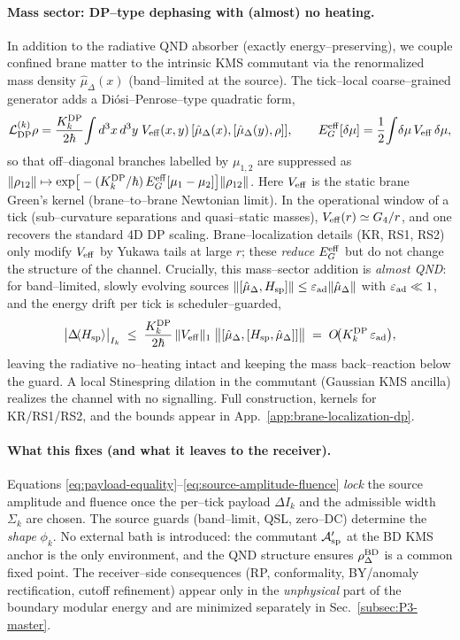 \documentclass[10pt]{article}
\theoremstyle{definition}
\theoremstyle{plain}
\begin{document}
\paragraph{Mass sector: DP–type dephasing with (almost) no heating.}\label{par:uom-main-036}
In addition to the radiative QND absorber (exactly energy–preserving), we couple confined brane matter to the intrinsic KMS commutant via the renormalized mass density $\hat\mu_\Delta(x)$ (band–limited at the source). The tick–local coarse–grained generator adds a Diósi–Penrose–type quadratic form,
\[
\mathcal L_{\rm DP}^{(k)}\rho
=\frac{K_k^{\rm DP}}{2\hbar}\!\int d^3x\,d^3y\;V_{\rm eff}(x,y)\,[\hat\mu_\Delta(x),[\hat\mu_\Delta(y),\rho]],
\qquad
E_G^{\rm eff}[\delta\mu]=\frac12\!\int\! \delta\mu\,V_{\rm eff}\,\delta\mu,
\]
so that off–diagonal branches labelled by $\mu_{1,2}$ are suppressed as
$\|\rho_{12}\|\mapsto \exp\!\big[-(K_k^{\rm DP}/\hbar)\,E_G^{\rm eff}[\mu_1-\mu_2]\big]\|\rho_{12}\|$.
Here $V_{\rm eff}$ is the static brane Green’s kernel (brane–to–brane Newtonian limit). In the operational window of a tick (sub–curvature separations and quasi–static masses), $V_{\rm eff}(r)\simeq G_4/r$, and one recovers the standard 4D DP scaling. Brane–localization details (KR, RS1, RS2) only modify $V_{\rm eff}$ by Yukawa tails at large $r$; these \emph{reduce} $E_G^{\rm eff}$ but do not change the structure of the channel. Crucially, this mass–sector addition is \emph{almost QND}: for band–limited, slowly evolving sources
$\|[\hat\mu_\Delta,H_{\rm sp}]\|\le \varepsilon_{\rm ad}\|\hat\mu_\Delta\|$ with $\varepsilon_{\rm ad}\ll1$, and the energy drift per tick is scheduler–guarded,
\[
\big|\Delta\!\langle H_{\rm sp}\rangle\big|_{I_k}
\;\le\; \frac{K_k^{\rm DP}}{2\hbar}\,
\|V_{\rm eff}\|_{1}\;\big\|[\hat\mu_\Delta,[H_{\rm sp},\hat\mu_\Delta]]\big\|
\;=\;O\!\big(K_k^{\rm DP}\,\varepsilon_{\rm ad}\big),
\]
leaving the radiative no–heating intact and keeping the mass back–reaction below the guard. A local Stinespring dilation in the commutant (Gaussian KMS ancilla) realizes the channel with no signalling. Full construction, kernels for KR/RS1/RS2, and the bounds appear in App.~\ref{app:brane-localization-dp}.




\paragraph{What this fixes (and what it leaves to the receiver).}\label{par:uom-main-037}
Equations \eqref{eq:payload-equality}–\eqref{eq:source-amplitude-fluence} \emph{lock} the
source amplitude and fluence once the per–tick payload $\Delta I_k$ and the admissible
width $\Sigma_k$ are chosen. The source guards (band–limit, QSL, zero–DC) determine the
\emph{shape} $\phi_k$.
No external bath is introduced: the commutant $\mathcal A_{\rm sp}'$ at the BD KMS anchor
is the only environment, and the QND structure ensures $\rho^{\rm BD}_\Delta$
is a common fixed point. The receiver–side consequences (RP, conformality, BY/anomaly
rectification, cutoff refinement) appear only in the \emph{unphysical} part of the boundary
modular energy and are minimized separately in Sec.~\ref{subsec:P3-master}.
\end{document}

